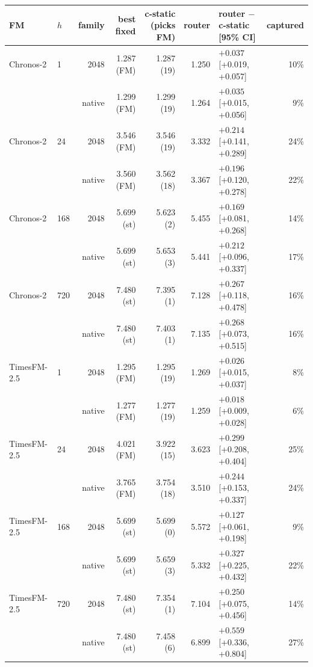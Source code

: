 \begin{tabular}{llrrrrlr}
\toprule
FM & $h$ & family & best fixed & c-static (picks FM) & router & router $-$ c-static [95\% CI] & captured \\
\midrule
Chronos-2 & 1 & 2048 & 1.287 (FM) & 1.287 (19) & 1.250 & $+0.037$ [+0.019, +0.057] & 10\% \\
 &  & native & 1.299 (FM) & 1.299 (19) & 1.264 & $+0.035$ [+0.015, +0.056] & 9\% \\
Chronos-2 & 24 & 2048 & 3.546 (FM) & 3.546 (19) & 3.332 & $+0.214$ [+0.141, +0.289] & 24\% \\
 &  & native & 3.560 (FM) & 3.562 (18) & 3.367 & $+0.196$ [+0.120, +0.278] & 22\% \\
Chronos-2 & 168 & 2048 & 5.699 (st) & 5.623 (2) & 5.455 & $+0.169$ [+0.081, +0.268] & 14\% \\
 &  & native & 5.699 (st) & 5.653 (3) & 5.441 & $+0.212$ [+0.096, +0.337] & 17\% \\
Chronos-2 & 720 & 2048 & 7.480 (st) & 7.395 (1) & 7.128 & $+0.267$ [+0.118, +0.478] & 16\% \\
 &  & native & 7.480 (st) & 7.403 (1) & 7.135 & $+0.268$ [+0.073, +0.515] & 16\% \\
TimesFM-2.5 & 1 & 2048 & 1.295 (FM) & 1.295 (19) & 1.269 & $+0.026$ [+0.015, +0.037] & 8\% \\
 &  & native & 1.277 (FM) & 1.277 (19) & 1.259 & $+0.018$ [+0.009, +0.028] & 6\% \\
TimesFM-2.5 & 24 & 2048 & 4.021 (FM) & 3.922 (15) & 3.623 & $+0.299$ [+0.208, +0.404] & 25\% \\
 &  & native & 3.765 (FM) & 3.754 (18) & 3.510 & $+0.244$ [+0.153, +0.337] & 24\% \\
TimesFM-2.5 & 168 & 2048 & 5.699 (st) & 5.699 (0) & 5.572 & $+0.127$ [+0.061, +0.198] & 9\% \\
 &  & native & 5.699 (st) & 5.659 (3) & 5.332 & $+0.327$ [+0.225, +0.432] & 22\% \\
TimesFM-2.5 & 720 & 2048 & 7.480 (st) & 7.354 (1) & 7.104 & $+0.250$ [+0.075, +0.456] & 14\% \\
 &  & native & 7.480 (st) & 7.458 (6) & 6.899 & $+0.559$ [+0.336, +0.804] & 27\% \\
\bottomrule
\end{tabular}
